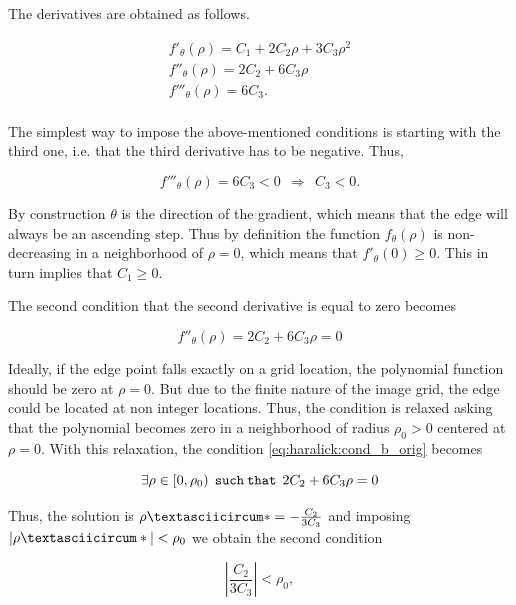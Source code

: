\documentclass{ipol}
\numberwithin{equation}{section}
\numberwithin{table}{section}
\begin{document}
The derivatives are obtained as follows.

\begin{align}
	f'_{\theta}(\rho) = C_1 + 2C_2\rho + 3C_3\rho^2 \nonumber \\
	f''_{\theta}(\rho) = 2C_2 + 6C_3\rho \nonumber \\
	f'''_{\theta}(\rho) = 6C_3 .\nonumber \\
\end{align}

The simplest way to impose the above-mentioned conditions is starting with the third one, i.e. that the third derivative has to be negative. Thus,

\begin{equation}
	f'''_{\theta}(\rho) = 6C_3 < 0 \ \ \Rightarrow \ \ C_3 < 0.
\end{equation}

By construction $\theta$ is the direction of the gradient, which means that the edge will always be an ascending step. Thus by definition the function $f_{\theta}(\rho)$ is non-decreasing in a neighborhood of $\rho=0$, which means that $f'_{\theta}(0) \geq 0$. This in turn implies that $C_1 \geq 0$.

The second condition that the second derivative is equal to zero becomes

\begin{equation}\label{eq:haralick:cond_b_orig}
	f''_{\theta}(\rho) = 2C_2 + 6C_3\rho = 0
\end{equation}

Ideally, if the edge point falls exactly on a grid location, the polynomial function 
should be zero at $\rho=0$. But due to the finite nature of the image grid, the edge could be located at non integer locations. Thus, the condition is relaxed asking that the polynomial becomes zero in a neighborhood of radius $\rho_0>0$ centered at $\rho=0$. 
With this relaxation, the condition \ref{eq:haralick:cond_b_orig} becomes

\begin{equation}
\exists\rho \in [0,\rho_0) \:\:  \mathtt{such\:that}  \:\:  2C_2 + 6C_3\rho = 0 \\
\end{equation}

Thus, the solution is $\rhoˆ*=-\frac{C_2}{3C_3} $ and imposing $|\rhoˆ*|<\rho_0$ we obtain the second condition

\begin{equation}
\left| \frac{C_2}{3C_3} \right| < \rho_0,
\end{equation}
\end{document}
